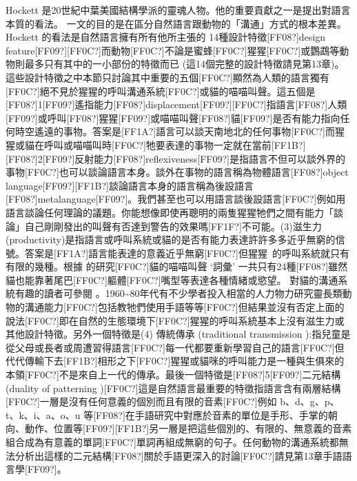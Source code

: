 Hockett 是20世紀中葉美國結構學派的靈魂人物。他的重要貢獻之一是提出對語言本質的看法。\parencite{Hockett1960} 一文的目的是在區分自然語言跟動物的「溝通」方式的根本差異。Hockett 的看法是自然語言擁有所有他所主張的 14種設計特徵[FF08?]design feature[FF09?][FF0C?]而動物[FF0C?]不論是蜜蜂[FF0C?]猩猩[FF0C?]或鸚鵡等動物則最多只有其中的一小部份的特徵而已 (這14個完整的設計特徵請見第13章)。這些設計特徵之中本節只討論其中重要的五個[FF0C?]顯然為人類的語言獨有[FF0C?]絕不見於猩猩的呼叫溝通系統[FF0C?]或貓的喵喵叫聲。這五個是[FF08?]1[FF09?]遙指能力[FF08?]displacement[FF09?][FF0C?]指語言[FF08?]人類[FF09?]或呼叫[FF08?]猩猩[FF09?]或喵喵叫聲[FF08?]貓[FF09?]是否有能力指向任何時空遙遠的事物。答案是[FF1A?]語言可以談天南地北的任何事物[FF0C?]而猩猩或貓在呼叫或喵喵叫時[FF0C?]牠要表達的事物一定就在當前[FF1B?][FF08?]2[FF09?]反射能力[FF08?]reflexiveness[FF09?]是指語言不但可以談外界的事物[FF0C?]也可以談論語言本身。談外在事物的語言稱為物體語言[FF08?]object language[FF09?][FF1B?]談論語言本身的語言稱為後設語言[FF08?]metalanguage[FF09?]。我們甚至也可以用語言談後設語言[FF0C?]例如用語言談論任何理論的議題。你能想像即使再聰明的兩隻猩猩牠們之間有能力「談論」自己剛剛發出的叫聲有否達到警告的效果嗎[FF1F?]不可能。(3)滋生力 (productivity)是指語言或呼叫系統或貓的是否有能力表達許許多多近乎無窮的信號。答案是[FF1A?]語言能表達的意義近乎無窮[FF0C?]但猩猩~的呼叫系統就只有有限的幾種。根據\parencite{NewmanWeitzman2015} 的研究[FF0C?]貓的喵喵叫聲 ‘詞彙’ 一共只有24種[FF08?]雖然貓也能靠著尾巴[FF0C?]軀體[FF0C?]嘴型等表達各種情緒或慾望。 對貓的溝通系統有趣的讀者可參閱 \parencite{Schötz2018}。1960{\textasciitilde}80年代有不少學者投入相當的人力物力研究靈長類動物的溝通能力[FF0C?]包括教牠們使用手語等等[FF0C?]但結果並沒有否定上面的說法[FF0C?]即在自然的生態環境下[FF0C?]猩猩的呼叫系統基本上沒有滋生力或其他設計特徵。另外一個特徵是(4) 傳統傳承 (traditional transmission ):指兒童是從父母或長者或周遭習得語言[FF0C?]每一代都要重新學習自己的語言[FF0C?]但代代傳輸下去[FF1B?]相形之下[FF0C?]猩猩或貓咪的呼叫能力是一種與生俱來的本領[FF0C?]不是來自上一代的傳承。最後一個特徵是[FF08?]5[FF09?]二元結構 (duality of patterning )[FF0C?]這是自然語言最重要的特徵指語言含有兩層結構[FF0C?]一層是沒有任何意義的個別而且有限的音素[FF0C?]例如 b、d、g、p、t、k、i、a、o、u 等[FF08?]在手語研究中對應於音素的單位是手形、手掌的朝向、動作、位置等[FF09?][FF1B?]另一層是把這些個別的、有限的、無意義的音素組合成為有意義的單詞[FF0C?]單詞再組成無窮的句子。任何動物的溝通系統都無法分析出這樣的二元結構[FF08?]關於手語更深入的討論[FF0C?]請見第13章手語語言學[FF09?]。


